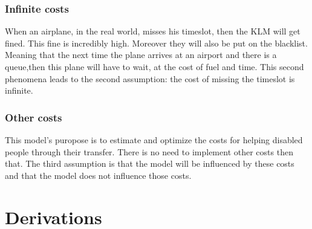 \documentclass[a4paper, 12pt, notitlepage]{report}
\begin{document}
		\subsubsection{Infinite costs} When an airplane, in the real world, misses his timeslot, then the KLM will get fined. This fine is incredibly high. Moreover they will also be put on the blacklist. Meaning that the next time the plane arrives at an airport and there is a queue,then this plane will have to wait, at the cost of fuel and time. This second phenomena leads to the second assumption: the cost of missing the timeslot is infinite.
		
		\subsubsection{Other costs} This model's puropose is to estimate and optimize the costs for helping disabled people through their transfer. There is no need to implement other costs then that. The third assumption is that the model will be influenced by these costs and that the model does not influence those costs.
		
\section{Derivations}
\end{document}
